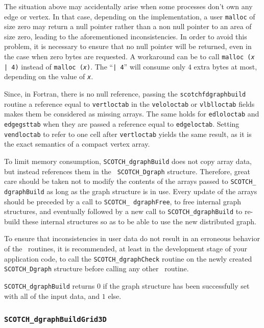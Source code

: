 \begin{itemize}
The situation above may accidentally arise when some processes don't
own any edge or vertex. In that case, depending on the implementation,
a user \texttt{malloc} of size zero may return a null pointer rather
than a non null pointer to an area of size zero, leading to the
aforementioned inconsistencies. In order to avoid this problem, it is
necessary to ensure that no null pointer will be returned, even in the
case when zero bytes are requested. A workaround can be to call
\texttt{malloc (\textit{x} | 4)} instead of \texttt{malloc
(\textit{x})}. The ``\texttt{| 4}'' will consume only $4$ extra bytes
at most, depending on the value of \texttt{\textit{x}}.

Since, in Fortran, there is no null reference, passing the
{\tt scotchf\lbt dgraph\lbt build} routine a reference equal to
{\tt vertloctab} in the {\tt veloloctab} or {\tt vlblloctab} fields
makes them be considered as missing arrays. The same holds for
{\tt edloloctab} and {\tt edgegsttab} when they are passed a
reference equal to {\tt edgeloctab}. Setting {\tt vendloctab}
to refer to one cell after {\tt vertloctab} yields the same result,
as it is the exact semantics of a compact vertex array.

To limit memory consumption, {\tt SCOTCH\_\lbt dgraph\lbo Build} does
not copy array data, but instead references them in the {\tt
SCOTCH\_\lbt Dgraph} structure. Therefore, great care should be taken
not to modify the contents of the arrays passed to {\tt SCOTCH\_\lbt
dgraph\lbo Build} as long as the graph structure is in use. Every
update of the arrays should be preceded by a call to {\tt SCOTCH\_\lbt
dgraph\lbo Free}, to free internal graph structures, and eventually
followed by a new call to {\tt SCOTCH\_\lbt dgraph\lbo Build} to
re-build these internal structures so as to be able to use the new
distributed graph.

To ensure that inconsistencies in user data do not result in an
erroneous behavior of the \libscotch\ routines, it is recommended, at
least in the development stage of your application code, to call the
{\tt SCOTCH\_\lbt dgraph\lbt Check} routine on the newly created
{\tt SCOTCH\_\lbt Dgraph} structure before calling any other
\libscotch\ routine.

\progret

{\tt SCOTCH\_dgraphBuild} returns $0$ if the graph structure has been
successfully set with all of the input data, and $1$ else.
\end{itemize}

\subsubsection{{\tt SCOTCH\_dgraphBuildGrid3D}}

